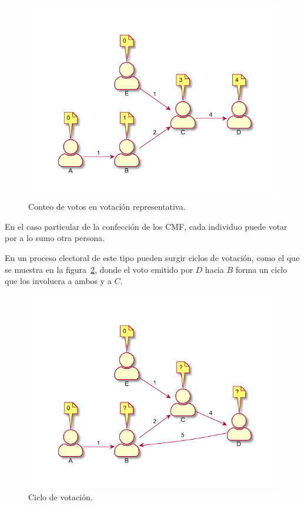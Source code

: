 \begin{figure}[h!]
    \centering
    \includegraphics{Graphics/rep-voting.pdf}
    \caption{Conteo de votos en votación representativa.}
    \label{fig:r-voting}
\end{figure}


En el caso particular de la confecci\'on de los CMF, cada individuo puede votar por a lo sumo otra persona.



En un proceso electoral de este tipo pueden surgir ciclos de votación, como el que se muestra en la figura~\ref{fig:voting-cycle}, donde el voto emitido por $D$ hacia $B$ forma un ciclo que los involucra a ambos y a $C$.  

\begin{figure}[h!]
    \centering
    \includegraphics{Graphics/voting-cycle.pdf}
    \caption{Ciclo de votaci\'on.}
    \label{fig:voting-cycle}
\end{figure}


